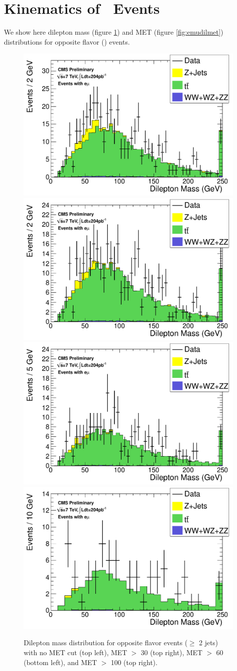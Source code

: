 \section{Kinematics of \emu ~Events}

We show here dilepton mass (figure \ref{fig:emudilmass}) and MET (figure \ref{fig:emudilmet}) distributions for opposite flavor (\emu) events.

\begin{figure}[hbt]
  \begin{center}
	\includegraphics[width=0.48\linewidth]{plots/hdilmass_em_allj.pdf}
	\includegraphics[width=0.48\linewidth]{plots/hdilmass_pfmet30_em_allj.pdf}
	\includegraphics[width=0.48\linewidth]{plots/hdilmass_pfmet60_em_allj.pdf}
	\includegraphics[width=0.48\linewidth]{plots/hdilmass_pfmet100_em_allj.pdf}
	\caption{
	  \label{fig:emudilmass}\protect 
	  Dilepton mass distribution for opposite flavor events ($\ge$ 2 jets)
	  with no MET cut (top left),
	  MET $>$ 30 (top right),
	  MET $>$ 60 (bottom left), and
	  MET $>$ 100 (top right).
	}
  \end{center}
\end{figure}


